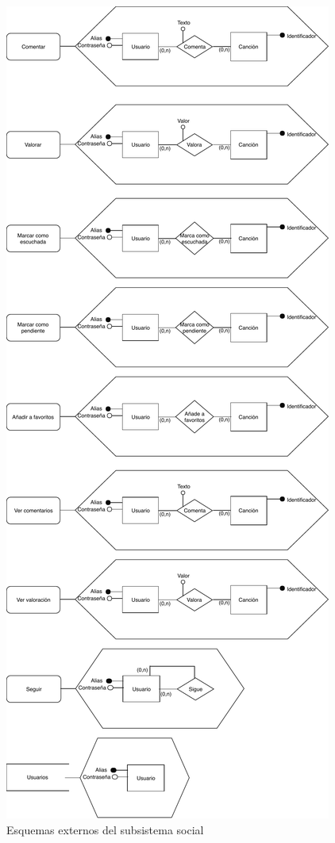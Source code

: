 \begin{figure}[H]
  \caption{Esquemas externos del subsistema social}
  \centering
  \includegraphics[scale=0.8]{diagramas/Esq-ext-social.pdf}
\end{figure}

